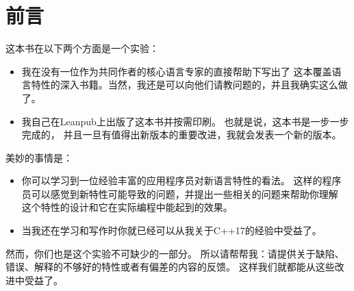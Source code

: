\chapter{前言}
这本书在以下两个方面是一个实验：
\begin{itemize}
    \item 我在没有一位作为共同作者的核心语言专家的直接帮助下写出了
    这本覆盖语言特性的深入书籍。当然，我还是可以向他们请教问题的，并且我确实这么做了。
    \item 我自己在Leanpub上出版了这本书并按需印刷。
    也就是说，这本书是一步一步完成的，
    并且一旦有值得出新版本的重要改进，我就会发表一个新的版本。
\end{itemize}

美妙的事情是：
\begin{itemize}
    \item 你可以学习到一位经验丰富的应用程序员对新语言特性的看法。
    这样的程序员可以感觉到新特性可能导致的问题，并提出一些相关的问题来帮助你理解
    这个特性的设计和它在实际编程中能起到的效果。
    \item 当我还在学习和写作时你就已经可以从我关于C++17的经验中受益了。
\end{itemize}
然而，你们也是这个实验不可缺少的一部分。
所以请帮帮我：请提供关于缺陷、错误、解释的不够好的特性或者有偏差的内容的反馈。
这样我们就都能从这些改进中受益了。


